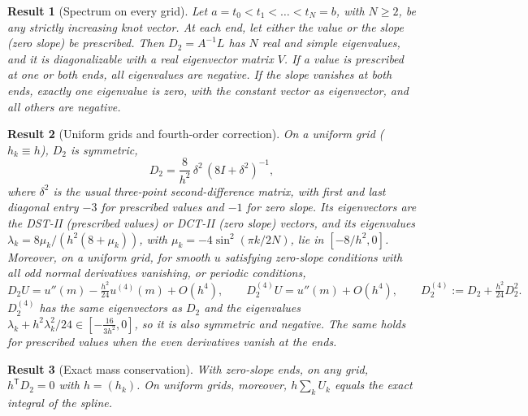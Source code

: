 \documentclass[11pt]{article}
\newtheorem{result}{Result}
\begin{document}
\begin{result}[Spectrum on every grid]\label{thm:spectrum}
Let $a=t_0<t_1<\dots<t_N=b$, with $N\ge2$, be any strictly increasing knot vector. At each end, let
either the value or the slope (zero slope) be prescribed. Then $D_2=A^{-1}L$ has $N$ real and simple
eigenvalues, and it is diagonalizable with a real eigenvector matrix $V$. If a value is prescribed at
one or both ends, all eigenvalues are negative. If the slope vanishes at both ends, exactly one
eigenvalue is zero, with the constant vector as eigenvector, and all others are negative.
\end{result}

\begin{result}[Uniform grids and fourth-order correction]\label{prop:uniform}\label{thm:fourth}
On a uniform grid ($h_k\equiv h$), $D_2$ is symmetric,
\begin{equation}\label{eq:D2}
D_2=\frac{8}{h^2}\,\delta^2\,(8I+\delta^2)^{-1},
\end{equation}
where $\delta^2$ is the usual three-point second-difference matrix, with first and last diagonal entry
$-3$ for prescribed values and $-1$ for zero slope. Its eigenvectors are the DST-II (prescribed values)
or DCT-II (zero slope) vectors, and its eigenvalues $\lambda_k=8\mu_k/(h^2(8+\mu_k))$, with
$\mu_k=-4\sin^2(\pi k/2N)$, lie in $[-8/h^2,0]$.
Moreover, on a uniform grid, for smooth $u$ satisfying zero-slope conditions with all odd normal derivatives
vanishing, or periodic conditions,
\begin{equation}\label{eq:D24}
D_2U=u''(m)-\tfrac{h^2}{24}u^{(4)}(m)+O(h^4),\qquad
D_2^{(4)}U=u''(m)+O(h^4),\qquad D_2^{(4)}:=D_2+\tfrac{h^2}{24}D_2^2 .
\end{equation}
$D_2^{(4)}$ has the same eigenvectors as $D_2$ and the eigenvalues
$\lambda_k+h^2\lambda_k^2/24\in[-\tfrac{16}{3h^2},0]$, so it is also symmetric and negative. The same holds
for prescribed values when the even derivatives vanish at the ends.
\end{result}

\begin{result}[Exact mass conservation]\label{prop:mass}
With zero-slope ends, on any grid, $h^{\mathsf T}D_2=0$ with $h=(h_k)$. On uniform grids, moreover,
$h\sum_kU_k$ equals the exact integral of the spline.
\end{result}
\end{document}
